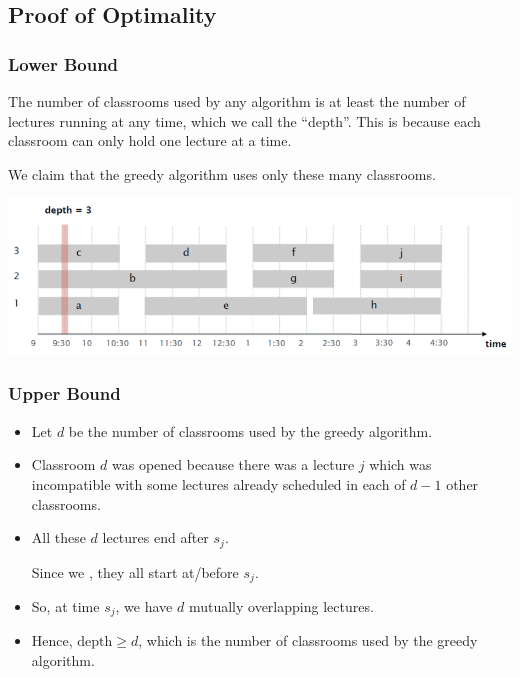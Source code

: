 \subsection{Proof of Optimality}

\subsubsection{Lower Bound}

The number of classrooms used by any algorithm is at least the number of lectures running at any time, which we call the ``depth''. This is because each classroom can only hold one lecture at a time.

We claim that the greedy algorithm uses only these many classrooms.

\begin{center}
    \includegraphics[width=0.75\linewidth]{figures/interval-scheduling-lower-bound.png}
\end{center}

\subsubsection{Upper Bound}

\begin{itemize}
    \item Let $d$ be the number of classrooms used by the greedy algorithm.

    \item Classroom $d$ was opened because there was a lecture $j$ which was incompatible with some lectures already scheduled in each of $d - 1$ other classrooms.

    \item All these $d$ lectures end after $s_j$.

    Since we , they all start at/before $s_j$.

    \item So, at time $s_j$, we have $d$ mutually overlapping lectures.

    \item Hence, $\text{depth} \ge d$, which is the number of classrooms used by the greedy algorithm.
\end{itemize}

